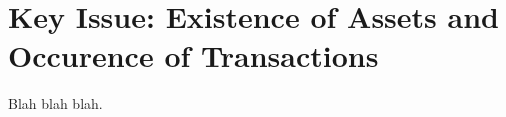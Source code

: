 \section{Key Issue: Existence of Assets and Occurence of Transactions}

Blah blah blah.

 

%
%
%
%
%
%
%
%
